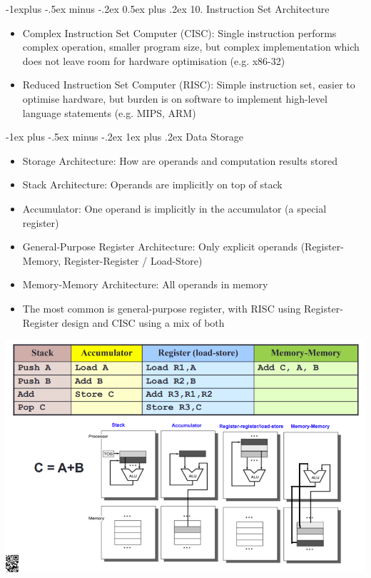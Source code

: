 \documentclass[10pt, portrait]{article}
\makeatletter
\renewcommand{\section}{\@startsection{section}{1}{0mm}%
                                {-1ex plus -.5ex minus -.2ex}%
                                {0.5ex plus .2ex}%
                                {\normalfont\large\bfseries}}
\renewcommand{\section}{\@startsection{section}{2}{0mm}%
                                {-1explus -.5ex minus -.2ex}%
                                {0.5ex plus .2ex}%
                                {\normalfont\normalsize\bfseries}}
\renewcommand{\subsection}{\@startsection{subsection}{3}{0mm}%
                                {-1ex plus -.5ex minus -.2ex}%
                                {1ex plus .2ex}%
                                {\normalfont\small\bfseries}}%
\makeatother
\begin{document}
\begin{multicols*}{2}
\section{10. Instruction Set Architecture}
\begin{itemize}
    \item Complex Instruction Set Computer (CISC): Single instruction performs complex operation, smaller program size, but complex implementation which does not leave room for hardware optimisation (e.g. x86-32)
    \item Reduced Instruction Set Computer (RISC): Simple instruction set, easier to optimise hardware, but burden is on software to implement high-level language statements (e.g. MIPS, ARM)
\end{itemize}

\subsection{Data Storage}
\begin{itemize}
    \item Storage Architecture: How are operands and computation results stored
    \item Stack Architecture: Operands are implicitly on top of stack
    \item Accumulator: One operand is implicitly in the accumulator (a special register)
    \item General-Purpose Register Architecture: Only explicit operands (Register-Memory, Register-Register / Load-Store)
    \item Memory-Memory Architecture: All operands in memory
    \item The most common is general-purpose register, with RISC using Register-Register design and CISC using a mix of both
\end{itemize}
\begin{center}
    \includegraphics[width=\linewidth]{architecture.png}
\end{center}


\end{multicols*}
\end{document}
